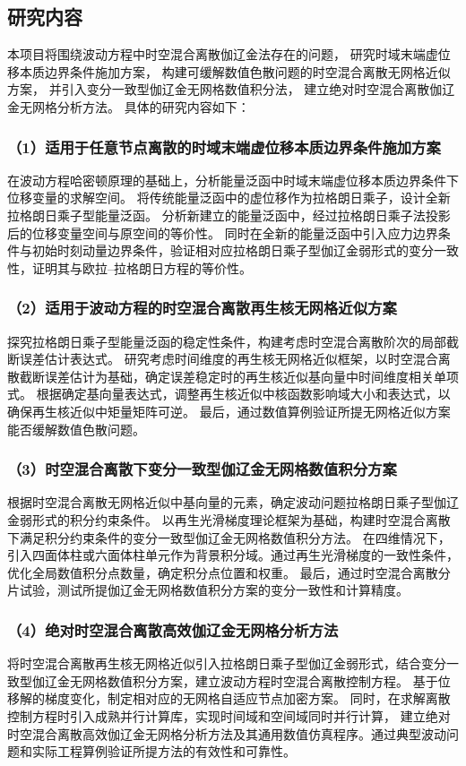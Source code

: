 \subsection{研究内容}
本项目将围绕波动方程中时空混合离散伽辽金法存在的问题，
研究时域末端虚位移本质边界条件施加方案，
构建可缓解数值色散问题的时空混合离散无网格近似方案，
并引入变分一致型伽辽金无网格数值积分法，
建立绝对时空混合离散伽辽金无网格分析方法。
具体的研究内容如下：

\subsubsection*{\bfseries （1）适用于任意节点离散的时域末端虚位移本质边界条件施加方案}
在波动方程哈密顿原理的基础上，分析能量泛函中时域末端虚位移本质边界条件下位移变量的求解空间。
将传统能量泛函中的虚位移作为拉格朗日乘子，设计全新拉格朗日乘子型能量泛函。
分析新建立的能量泛函中，经过拉格朗日乘子法投影后的位移变量空间与原空间的等价性。
同时在全新的能量泛函中引入应力边界条件与初始时刻动量边界条件，验证相对应拉格朗日乘子型伽辽金弱形式的变分一致性，证明其与欧拉--拉格朗日方程的等价性。


\subsubsection*{\bfseries （2）适用于波动方程的时空混合离散再生核无网格近似方案}
探究拉格朗日乘子型能量泛函的稳定性条件，构建考虑时空混合离散阶次的局部截断误差估计表达式。
研究考虑时间维度的再生核无网格近似框架，以时空混合离散截断误差估计为基础，确定误差稳定时的再生核近似基向量中时间维度相关单项式。
根据确定基向量表达式，调整再生核近似中核函数影响域大小和表达式，以确保再生核近似中矩量矩阵可逆。
最后，通过数值算例验证所提无网格近似方案能否缓解数值色散问题。

\subsubsection*{\bfseries （3）时空混合离散下变分一致型伽辽金无网格数值积分方案}
根据时空混合离散无网格近似中基向量的元素，确定波动问题拉格朗日乘子型伽辽金弱形式的积分约束条件。
以再生光滑梯度理论框架为基础，构建时空混合离散下满足积分约束条件的变分一致型伽辽金无网格数值积分方法。
在四维情况下，引入四面体柱或六面体柱单元作为背景积分域。通过再生光滑梯度的一致性条件，优化全局数值积分点数量，确定积分点位置和权重。
最后，通过时空混合离散分片试验，测试所提伽辽金无网格数值积分方案的变分一致性和计算精度。

\subsubsection*{\bfseries （4）绝对时空混合离散高效伽辽金无网格分析方法}
将时空混合离散再生核无网格近似引入拉格朗日乘子型伽辽金弱形式，结合变分一致型伽辽金无网格数值积分方案，建立波动方程时空混合离散控制方程。
基于位移解的梯度变化，制定相对应的无网格自适应节点加密方案。
同时，在求解离散控制方程时引入成熟并行计算库，实现时间域和空间域同时并行计算，
建立绝对时空混合离散高效伽辽金无网格分析方法及其通用数值仿真程序。通过典型波动问题和实际工程算例验证所提方法的有效性和可靠性。

